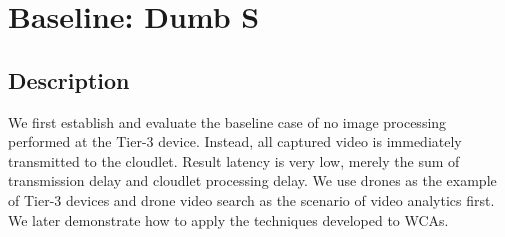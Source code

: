 \section{Baseline: Dumb  S}
\label{sec:dumbdrone}

\subsection{Description}

We first establish and evaluate the baseline case of no image processing
performed at the Tier-3 device.  Instead, all captured video is immediately
transmitted to the cloudlet.  Result latency is very low, merely the sum of
transmission delay and cloudlet processing delay. We use drones as the example
of Tier-3 devices and drone video search as the scenario of video analytics
first. We later demonstrate how to apply the techniques developed to WCAs.

